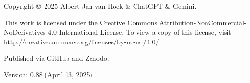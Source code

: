 \newpage
\thispagestyle{empty} %
\vspace*{0.1\textheight} %

\noindent %
Copyright \copyright\ 2025 Albert Jan van Hoek \& ChatGPT \& Gemini. %

\bigskip %

\noindent %
This work is licensed under the Creative Commons Attribution-NonCommercial-NoDerivatives 4.0 International License. To view a copy of this license, visit\\ \url{http://creativecommons.org/licenses/by-nc-nd/4.0/}

\bigskip %

\noindent %
Published via GitHub and Zenodo.

\bigskip

\noindent %
Version: 0.88 (April 13, 2025) %


\vfill %
\cleardoublepage %
